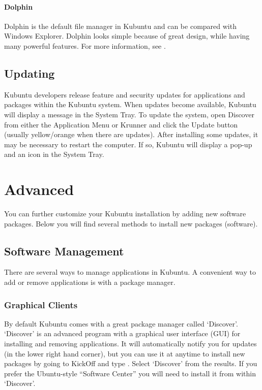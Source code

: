 \documentclass[letterpaper,10pt,english]{sphinxmanual}
\begin{document}
\subsubsection{Dolphin}
\label{\detokenize{docs/basic:dolphin}}
Dolphin is the default file manager in Kubuntu and can be compared with Windows Explorer. Dolphin looks simple because of great design, while having many powerful features. For more information, see .


\section{Updating}
\label{\detokenize{docs/basic:updating}}
Kubuntu developers release feature and security updates for applications and packages within the Kubuntu system. When updates become available, Kubuntu will display a message in the System Tray. To update the system, open Discover from either the Application Menu or Krunner and click the Update button (usually yellow/orange when there are updates). After installing some updates, it may be necessary to restart the computer. If so, Kubuntu will display a pop-up and an icon in the System Tray.

{\hyperref[\detokenize{docs/basic:basic}]{}}


\chapter{Advanced}
\label{\detokenize{docs/advanced:advanced}}\label{\detokenize{docs/advanced:advanced-link}}\label{\detokenize{docs/advanced::doc}}
You can further customize your Kubuntu installation by adding new software packages. Below you will find several methods to install new packages (software).


\section{Software Management}
\label{\detokenize{docs/advanced:software-management}}
There are several ways to manage applications in Kubuntu. A convenient way to add or remove applications is with a package manager.


\subsection{Graphical Clients}
\label{\detokenize{docs/advanced:graphical-clients}}
By default Kubuntu comes with a great package manager called ‘Discover’. ‘Discover’ is an advanced program with a graphical user interface (GUI) for installing and removing applications. It will automatically notify you for updates (in the lower right hand corner), but you can use it at anytime to install new packages by going to KickOff and type . Select ‘Discover’ from the results. If you prefer the Ubuntu-style “Software Center” you will need to install it from within ‘Discover’.
\end{document}
